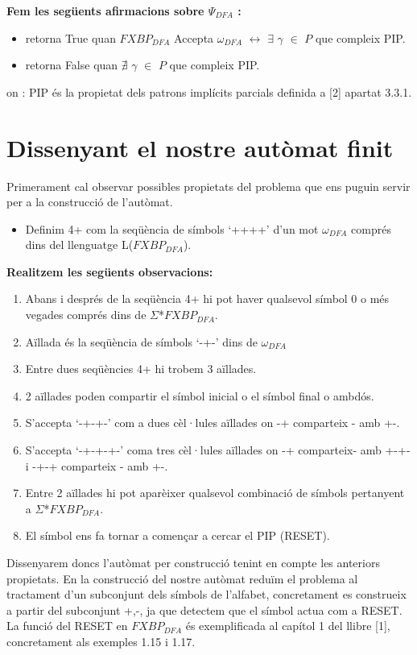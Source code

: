 \documentclass[12pt,a4paper]{report}
\def \dfa{$FXBP_{DFA} $}
\def \alphabetDFA{$\Sigma$*\dfa}
\def \wdfa{$\omega_{DFA} $}
\def \postDFA{$\Psi_{DFA}$}
\def \llesca{$\gamma$}
\begin{document}
\textbf{Fem les següents afirmacions sobre \postDFA{} :}
\begin{itemize}
\item retorna True quan \dfa{} Accepta \wdfa{} $\leftrightarrow$ $\exists$ \llesca{} $\in$ $P$ que compleix PIP.
\item retorna False quan $\nexists$ \llesca{} $\in$ $P$ que compleix PIP.
\end{itemize}
on : PIP és la propietat dels patrons implícits parcials definida a [2] apartat 3.3.1.

\section{Dissenyant el nostre autòmat finit}

Primerament cal observar possibles propietats del problema que ens puguin servir per a la construcció de l’autòmat.

\begin{itemize}
\item Definim 4+ com la seqüència de símbols ‘++++’ d’un mot \wdfa{} comprés dins del llenguatge L(\dfa{}).
\end{itemize}

\textbf{Realitzem les següents observacions:}

\begin{enumerate}
\item Abans i després de la seqüència 4+ hi pot haver qualsevol símbol 0 o més vegades comprés dins de \alphabetDFA{}.
\item Aïllada és la seqüència de símbols ‘-+-’ dins de \wdfa{}
\item Entre dues seqüències 4+ hi trobem 3 aïllades.
\item 2 aïllades poden compartir el símbol inicial o el símbol final o ambdós.
\item S’accepta ‘-+-+-’ com a dues cèl·lules aïllades on -+ comparteix - amb +-.
\item S’accepta ‘-+-+-+-’ coma  tres cèl·lules aïllades on -+ comparteix- amb +-+- i -+-+ comparteix - amb +-.
\item Entre 2 aïllades hi pot aparèixer qualsevol combinació de símbols pertanyent a \alphabetDFA{}.
\item El símbol \Return ens fa tornar a començar a cercar el PIP (RESET).
\end{enumerate}


Dissenyarem doncs l’autòmat per construcció tenint en compte les anteriors propietats. En la construcció del nostre autòmat reduïm el problema al tractament d’un subconjunt dels símbols de l’alfabet, concretament es construeix a partir del subconjunt {+,-}, ja que detectem que el símbol \Return actua com a RESET. La funció del RESET en \dfa{} és exemplificada al capítol 1 del llibre [1], concretament als exemples 1.15 i 1.17.
\end{document}
